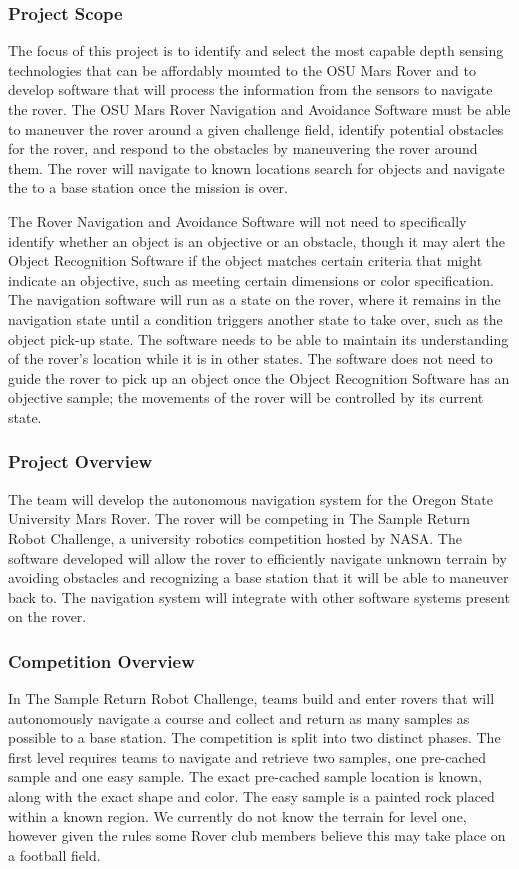 \documentclass[10pt, oneside,onecolumn]{IEEEtran}
\begin{document}
\begin{titlepage}
\subsubsection{Project Scope}
The focus of this project is to identify and select the most capable depth sensing technologies that can be affordably mounted to the OSU Mars Rover and to develop software that will process the information from the sensors to navigate the rover. The OSU Mars Rover Navigation and Avoidance Software must be able to maneuver the rover around a given challenge field, identify potential obstacles for the rover, and respond to the obstacles by maneuvering the rover around them. The rover will navigate to known locations search for objects and navigate the to a base station once the mission is over. 

The Rover Navigation and Avoidance Software will not need to specifically identify whether an object is an objective or an obstacle, though it may alert the Object Recognition Software if the object matches certain criteria that might indicate an objective, such as meeting certain dimensions or color specification. The navigation software will run as a state on the rover, where it remains in the navigation state until a condition triggers another state to take over, such as the object pick-up state. The software needs to be able to maintain its understanding of the rover's location while it is in other states. The software does not need to guide the rover to pick up an object once the Object Recognition Software has an objective sample; the movements of the rover will be controlled by its current state. 

\subsubsection{Project Overview}
The team will develop the autonomous navigation system for the Oregon State University Mars Rover. The rover will be competing in The Sample Return Robot Challenge, a university robotics competition hosted by NASA. The software developed will allow the rover to efficiently navigate unknown terrain by avoiding obstacles and recognizing a base station that it will be able to maneuver back to. The navigation system will integrate with other software systems present on the rover. 

\subsubsection{Competition Overview}
In The Sample Return Robot Challenge, teams build and enter rovers that will autonomously navigate a course and collect and return as many samples as possible to a base station. The competition is split into two distinct phases. 
The first level requires teams to navigate and retrieve two samples, one pre-cached sample and one easy sample. The exact pre-cached sample location is known, along with the exact shape and color. The easy sample is a painted rock placed within a known region. We currently do not know the terrain for level one, however given the rules some Rover club members believe this may take place on a football field.


\end{titlepage}
\end{document}
